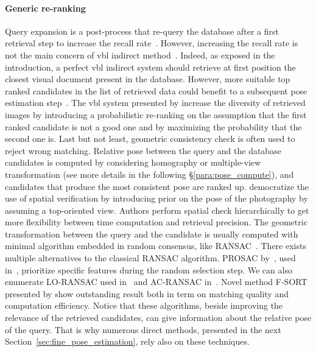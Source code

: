        	\paragraph{Generic re-ranking}    
			Query expansion is a post-process that re-query the database after a first retrieval step to increase the recall rate~\citep{Chum2007,Chum2011,Tolias2014}. However, increasing the recall rate is not the main concern of \ac{vbl} indirect method~\citep{Sattler2012}. Indeed, as exposed in the introduction, a perfect \ac{vbl} indirect system should retrieve at first position the closest visual document present in the database. However, more suitable top ranked candidates in the list of retrieved data could benefit to a subsequent pose estimation step~\citep{Song2016}. The \ac{vbl} system presented by \citet{Cao2013} increase the diversity of retrieved images by introducing a probabilistic re-ranking on the assumption that the first ranked candidate is not a good one and by maximizing the probability that the second one is.
			\label{par:ransac}
 			Last but not least, geometric consistency check is often used to reject wrong matching. Relative pose between the query and the database candidates is computed by considering homography or multiple-view transformation (see more details in the following \S\ref{para:pose_compute}), and candidates that produce the most consistent pose are ranked up. \citet{Philbin2007} democratize the use of spatial verification by introducing prior on the pose of the photography by assuming a top-oriented view. Authors perform spatial check hierarchically to get more flexibility between time computation and retrieval precision. The geometric transformation between the query and the candidate is usually computed with minimal algorithm embedded in random consensus, like RANSAC~\citep{Fischler1981}. There exists multiple alternatives to the classical RANSAC algorithm. PROSAC by~\citep{Chum2005}, used in~\citep{Donoser2014}, prioritize specific features during the random selection step. We can also enumerate LO-RANSAC used in~\citep{Philbin2007} and AC-RANSAC in~\citep{Qu2015,Qu2016}. Novel method F-SORT presented by \citet{Chan2016} show outstanding result both in term on matching quality and computation efficiency. Notice that these algorithms, beside improving the relevance of the retrieved candidates, can give information about the relative pose of the query. That is why numerous direct methods, presented in the next Section~\ref{sec:fine_pose_estimation}, rely also on these techniques.